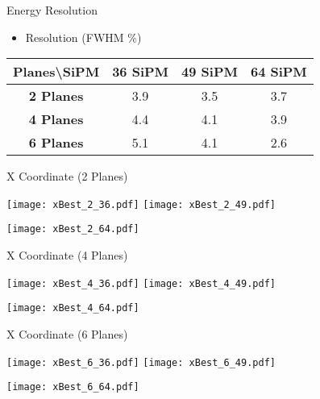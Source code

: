 \documentclass{beamer}
\begin{document}
\begin{frame}{Energy Resolution}
\begin{center}
\begin{itemize}
\item Resolution (FWHM \%)
\vspace{0.5 cm}
\end{itemize}
 \begin{tabular}{c|ccc|}
  \toprule
  Planes\textbackslash SiPM & \textbf{36 SiPM} & \textbf{49 SiPM} & \textbf{64 SiPM} \\
   \hline
  \textbf{2 Planes} & 3.9 & 3.5 & 3.7 \\
  \textbf{4 Planes} & 4.4 & 4.1 & 3.9 \\
  \textbf{6 Planes} & 5.1 & 4.1 & 2.6 \\
    \toprule
 \end{tabular}
\end{center}
\end{frame}

\begin{frame}{X Coordinate (2 Planes)}
\begin{adjustwidth}{-1.5em}{-1.5em}
	\texttt{[image: xBest\_2\_36.pdf]}
	\texttt{[image: xBest\_2\_49.pdf]} \\
	\begin{center} {\texttt{[image: xBest\_2\_64.pdf]}} \end{center}
\end{adjustwidth}
\end{frame}

\begin{frame}{X Coordinate (4 Planes)}
\begin{adjustwidth}{-1.5em}{-1.5em}
	\texttt{[image: xBest\_4\_36.pdf]}
	\texttt{[image: xBest\_4\_49.pdf]} \\
	\begin{center} {\texttt{[image: xBest\_4\_64.pdf]}} \end{center}
\end{adjustwidth}
\end{frame}

\begin{frame}{X Coordinate (6 Planes)}
\begin{adjustwidth}{-1.5em}{-1.5em}
	\texttt{[image: xBest\_6\_36.pdf]}
	\texttt{[image: xBest\_6\_49.pdf]} \\
	\begin{center} {\texttt{[image: xBest\_6\_64.pdf]}} \end{center}
\end{adjustwidth}
\end{frame}
\end{document}
